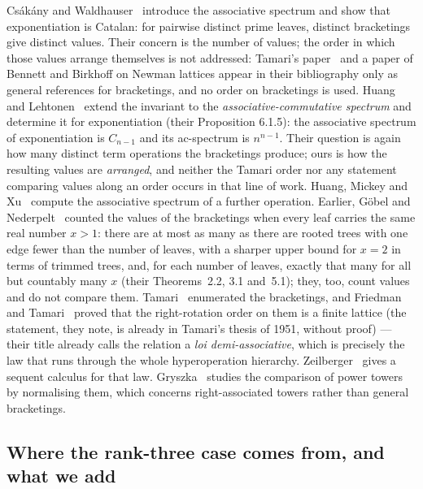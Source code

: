 \documentclass[11pt,a4paper]{article}
\theoremstyle{plain}
\theoremstyle{definition}
\begin{document}
Cs\'ak\'any and Waldhauser~\cite{CsW} introduce the associative spectrum and show
that exponentiation is Catalan: for pairwise distinct prime leaves, distinct
bracketings give distinct values. Their concern is the number of values; the
order in which those values arrange themselves is not addressed: Tamari's
paper~\cite{Tamari} and a paper of Bennett and Birkhoff on Newman lattices appear in
their bibliography only as general references for bracketings, and no order on
bracketings is used. Huang and Lehtonen~\cite{HL} extend the invariant to the
\emph{associative-commutative spectrum} and determine it for exponentiation
(their Proposition 6.1.5): the associative spectrum of exponentiation is $C_{n-1}$
and its ac-spectrum is $n^{n-1}$. Their question is again how many distinct term
operations the bracketings produce; ours is how the resulting values are
\emph{arranged}, and neither the Tamari order nor any statement comparing values along
an order occurs in that line of work. Huang, Mickey and Xu~\cite{HMX} compute the associative
spectrum of a further operation. Earlier, G\"obel and Nederpelt~\cite{GN} counted the
values of the bracketings when every leaf carries the same real number $x>1$: there are
at most as many as there are rooted trees with one edge fewer than the number of leaves,
with a sharper upper bound for $x=2$ in terms of trimmed trees, and, for each number of
leaves, exactly that many for all but countably many $x$ (their Theorems~2.2, 3.1
and~5.1); they, too, count values and do not compare them. Tamari~\cite{Tamari} enumerated the bracketings, and Friedman and
Tamari~\cite{FT} proved that the right-rotation order on them is a finite lattice (the
statement, they note, is already in Tamari's thesis of 1951, without proof) ---
their title already calls the relation a \emph{loi demi-associative}, which is
precisely the law that runs through the whole hyperoperation hierarchy.
Zeilberger~\cite{Zeil} gives a sequent calculus for that law. Gryszka~\cite{Gry} studies the comparison of power towers
by normalising them, which concerns right-associated towers rather than general
bracketings.

\subsection{Where the rank-three case comes from, and what we add}
\end{document}
